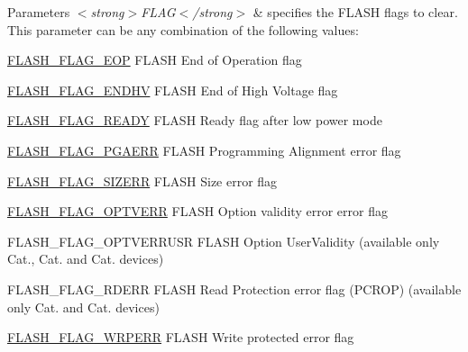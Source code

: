 \begin{DoxyParams}{Parameters}
{\em $<$strong$>$\-F\-L\-A\-G$<$/strong$>$} & specifies the F\-L\-A\-S\-H flags to clear. This parameter can be any combination of the following values\-: \begin{DoxyItemize}
\item \hyperlink{group___f_l_a_s_h___flags_gaf043ba4d8f837350bfc7754a99fae5a9}{F\-L\-A\-S\-H\-\_\-\-F\-L\-A\-G\-\_\-\-E\-O\-P} F\-L\-A\-S\-H End of Operation flag \item \hyperlink{group___f_l_a_s_h___flags_ga9979b826ad18f10a565f5c0bbab2cd98}{F\-L\-A\-S\-H\-\_\-\-F\-L\-A\-G\-\_\-\-E\-N\-D\-H\-V} F\-L\-A\-S\-H End of High Voltage flag \item \hyperlink{group___f_l_a_s_h___flags_gacc11026963ab32982bb4811bd409c06f}{F\-L\-A\-S\-H\-\_\-\-F\-L\-A\-G\-\_\-\-R\-E\-A\-D\-Y} F\-L\-A\-S\-H Ready flag after low power mode \item \hyperlink{group___f_l_a_s_h___flags_ga2c3f4dbea065f8ea2987eada4dab30bd}{F\-L\-A\-S\-H\-\_\-\-F\-L\-A\-G\-\_\-\-P\-G\-A\-E\-R\-R} F\-L\-A\-S\-H Programming Alignment error flag \item \hyperlink{group___f_l_a_s_h___flags_gac20909664e371d2ca0436a055393f9c4}{F\-L\-A\-S\-H\-\_\-\-F\-L\-A\-G\-\_\-\-S\-I\-Z\-E\-R\-R} F\-L\-A\-S\-H Size error flag \item \hyperlink{group___f_l_a_s_h___flags_gacb2c4c991a260c3f110cd8c72f302864}{F\-L\-A\-S\-H\-\_\-\-F\-L\-A\-G\-\_\-\-O\-P\-T\-V\-E\-R\-R} F\-L\-A\-S\-H Option validity error error flag \item F\-L\-A\-S\-H\-\_\-\-F\-L\-A\-G\-\_\-\-O\-P\-T\-V\-E\-R\-R\-U\-S\-R F\-L\-A\-S\-H Option User\-Validity (available only Cat., Cat. and Cat. devices) \item F\-L\-A\-S\-H\-\_\-\-F\-L\-A\-G\-\_\-\-R\-D\-E\-R\-R F\-L\-A\-S\-H Read Protection error flag (P\-C\-R\-O\-P) (available only Cat. and Cat. devices) \item \hyperlink{group___f_l_a_s_h___flags_ga6abf64f916992585899369166db3f266}{F\-L\-A\-S\-H\-\_\-\-F\-L\-A\-G\-\_\-\-W\-R\-P\-E\-R\-R} F\-L\-A\-S\-H Write protected error flag \end{DoxyItemize}
\\
\hline
\end{DoxyParams}

